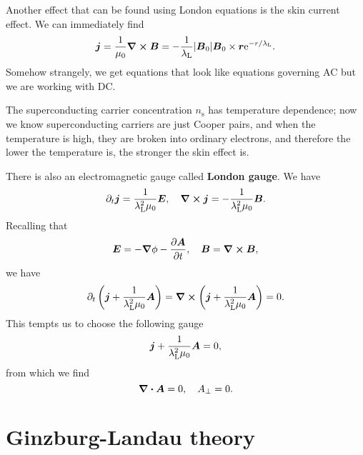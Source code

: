 \documentclass[hyperref, a4paper]{article}
\newcommand*{\ee}{\mathrm{e}}
\newcommand*{\concept}[1]{{\textbf{#1}}}
\begin{document}
Another effect that can be found using London equations is
the skin current effect.
We can immediately find 
\begin{equation}
    \vb*{j} = \frac{1}{\mu_0} \curl{\vb*{B}}
    = - \frac{1}{\lambda_{\text{L}}} \abs{\vb*{B}_0} \vb*{B}_0 \times \vb*{r} \ee^{- r / \lambda_{\text{L}}}.
\end{equation}
Somehow strangely, we get equations that look like equations governing AC 
but we are working with DC. 

The superconducting carrier concentration $n_{\text{s}}$
has temperature dependence;
now we know superconducting carriers are just Cooper pairs, 
and when the temperature is high, 
they are broken into ordinary electrons,
and therefore the lower the temperature is, 
the stronger the skin effect is.

There is also an electromagnetic gauge called \concept{London gauge}.
We have 
\begin{equation}
    \partial_t \vb*{j} = \frac{1}{\lambda_{\text{L}}^2 \mu_0} \vb*{E}, \quad 
    \curl{\vb*{j}} = - \frac{1}{\lambda_{\text{L}}^2 \mu_0} \vb*{B}.
\end{equation}
Recalling that 
\begin{equation}
    \vb*{E} = - \grad{\phi} - \pdv{\vb*{A}}{t}, \quad 
    \vb*{B} = \curl{\vb*{B}},
\end{equation}
we have 
\begin{equation}
    \partial_t \left(
        \vb*{j} + \frac{1}{\lambda_{\text{L}}^2 \mu_0} \vb*{A}
    \right) = \curl{
        \left(
        \vb*{j} + \frac{1}{\lambda_{\text{L}}^2 \mu_0} \vb*{A}
        \right)
    } = 0.
\end{equation}
This tempts us to choose the following gauge 
\begin{equation}
    \vb*{j} + \frac{1}{\lambda_{\text{L}}^2 \mu_0} \vb*{A} = 0,
\end{equation}
from which we find 
\begin{equation}
    \div{\vb*{A}} = 0, \quad A_{\bot} = 0.
\end{equation}

\section{Ginzburg-Landau theory}
\end{document}
